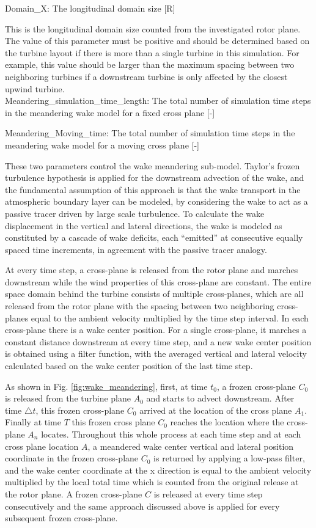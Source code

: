 \documentclass{umthesis}
\begin{document}
\noindent Domain\_X: The longitudinal domain size [R]

This is the longitudinal domain size counted from the investigated rotor plane. The value of this parameter must be positive and should be determined based on the turbine layout if there is more than a single turbine in this simulation. For example, this value should be larger than the maximum spacing between two neighboring turbines if a downstream turbine is only affected by the closest upwind turbine.\\

\noindent Meandering\_simulation\_time\_length: The total number of simulation time steps in the meandering wake model for a fixed cross plane [-]

\noindent Meandering\_Moving\_time: The total number of simulation time steps in the meandering wake model for a moving cross plane [-]

These two parameters control the wake meandering sub-model. Taylor’s frozen turbulence hypothesis is applied for the downstream advection of the wake, and the fundamental assumption of this approach is that the wake transport in the atmospheric boundary layer can be modeled, by considering the wake to act as a passive tracer driven by large scale turbulence. To calculate the wake displacement in the vertical and lateral directions, the wake is modeled as constituted by a cascade of wake deficits, each “emitted” at consecutive equally spaced time increments, in agreement with the passive tracer analogy.

At every time step, a cross-plane is released from the rotor plane and marches downstream while the wind properties of this cross-plane are constant. The entire space domain behind the turbine consists of multiple cross-planes, which are all released from the rotor plane with the spacing between two neighboring cross-planes equal to the ambient velocity multiplied by the time step interval. In each cross-plane there is a wake center position. For a single cross-plane, it marches a constant distance downstream at every time step, and a new wake center position is obtained using a filter function, with the averaged vertical and lateral velocity calculated based on the wake center position of the last time step.

As shown in Fig. \ref{fig:wake_meandering}, first, at time $t_0$, a frozen cross-plane $C_0$ is released from the turbine plane $A_0$ and starts to advect downstream. After time $\triangle t$, this frozen cross-plane $C_0$ arrived at the location of the cross plane $A_1$. Finally at time $T$ this frozen cross plane $C_0$ reaches the location where the cross-plane $A_n$ locates. Throughout this whole process at each time step and at each cross plane location $A$, a meandered wake center vertical and lateral position coordinate in the frozen cross-plane $C_0$ is returned by applying a low-pass filter, and the wake center coordinate at the x direction is equal to the ambient velocity multiplied by the local total time which is counted from the original release at the rotor plane. A frozen cross-plane $C$ is released at every time step consecutively and the same approach discussed above is applied for every subsequent frozen cross-plane.
\end{document}
